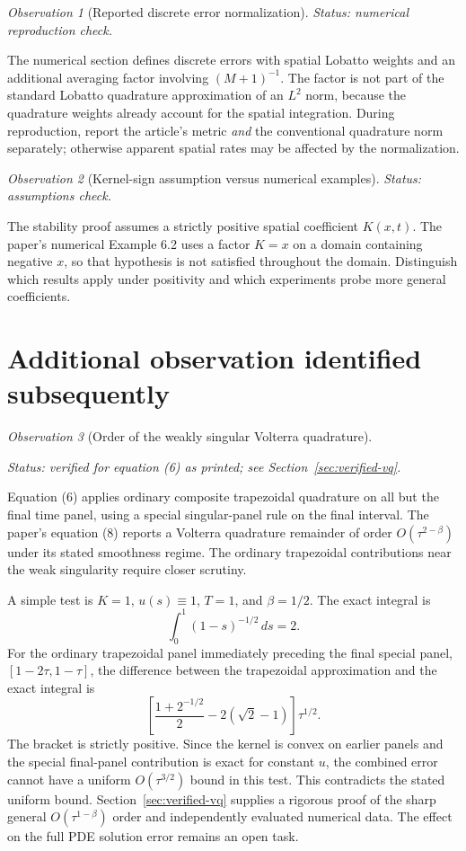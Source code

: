 \documentclass[11pt,a4paper]{amsart}
\theoremstyle{remark}
\newtheorem{observation}{Observation}
\theoremstyle{plain}
\theoremstyle{remark}
\newcommand{\auditstatus}[1]{\par\noindent\emph{#1.}\enspace}
\numberwithin{equation}{section}
\begin{document}
\begin{observation}[Reported discrete error normalization]
\auditstatus{Status: numerical reproduction check}

The numerical section defines discrete errors with spatial Lobatto weights and an additional averaging factor involving $(M+1)^{-1}$. The factor is not part of the standard Lobatto quadrature approximation of an $L^2$ norm, because the quadrature weights already account for the spatial integration. During reproduction, report the article's metric \emph{and} the conventional quadrature norm separately; otherwise apparent spatial rates may be affected by the normalization.
\end{observation}

\begin{observation}[Kernel-sign assumption versus numerical examples]
\auditstatus{Status: assumptions check}

The stability proof assumes a strictly positive spatial coefficient $K(x,t)$. The paper's numerical Example 6.2 uses a factor $K=x$ on a domain containing negative $x$, so that hypothesis is not satisfied throughout the domain. Distinguish which results apply under positivity and which experiments probe more general coefficients.
\end{observation}

\section{Additional observation identified subsequently}
\label{sec:volterra-candidate}

\begin{observation}[Order of the weakly singular Volterra quadrature]
\label{obs:volterra-order}
\auditstatus{Status: verified for equation (6) as printed; see Section~\ref{sec:verified-vq}}

Equation (6) applies ordinary composite trapezoidal quadrature on all but the final time panel, using a special singular-panel rule on the final interval. The paper's equation (8) reports a Volterra quadrature remainder of order $O(\tau^{2-\beta})$ under its stated smoothness regime. The ordinary trapezoidal contributions near the weak singularity require closer scrutiny.

A simple test is $K=1$, $u(s)\equiv1$, $T=1$, and $\beta=1/2$. The exact integral is
\[
\int_0^1(1-s)^{-1/2}\,ds=2.
\]
For the ordinary trapezoidal panel immediately preceding the final special panel, $[1-2\tau,1-\tau]$, the difference between the trapezoidal approximation and the exact integral is
\[
\left[\frac{1+2^{-1/2}}{2}-2(\sqrt 2-1)\right]\tau^{1/2}.
\]
The bracket is strictly positive. Since the kernel is convex on earlier panels and the special final-panel contribution is exact for constant $u$, the combined error cannot have a uniform $O(\tau^{3/2})$ bound in this test. This contradicts the stated uniform bound. Section~\ref{sec:verified-vq} supplies a rigorous proof of the sharp general $O(\tau^{1-\beta})$ order and independently evaluated numerical data. The effect on the full PDE solution error remains an open task.
\end{observation}
\end{document}
